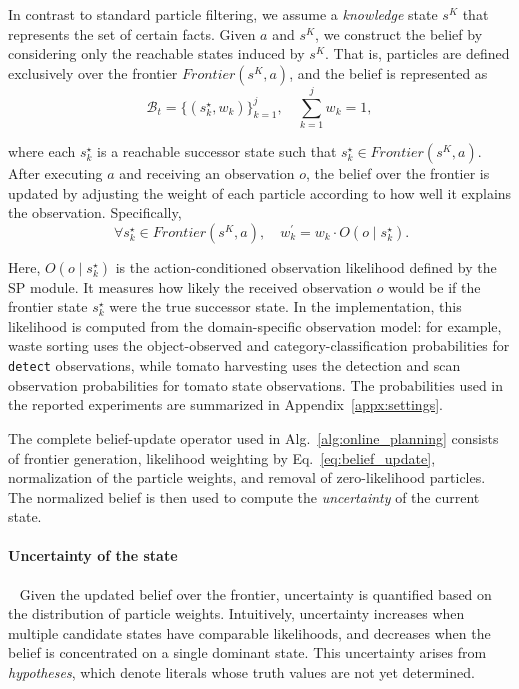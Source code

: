 In contrast to standard particle filtering, we assume a \textit{knowledge} state $s^{K}$ that represents the set of certain facts. Given $a$ and $s^{K}$, we construct the belief by considering only the reachable states induced by $s^{K}$. That is, particles are defined exclusively over the frontier $Frontier(s^{K}, a)$, and the belief is represented as
\[
\mathcal{B}_t = \{ (s_k^{\star}, w_k) \}_{k=1}^{j}, \quad \sum_{k=1}^{j} w_k = 1,
\]

where each $s_k^{\star}$ is a reachable successor state such that $s_k^{\star} \in Frontier(s^{K}, a)$.
After executing $a$ and receiving an observation $o$, the belief over the frontier is updated by adjusting the weight of each particle according to how well it explains the observation. Specifically, 
\begin{equation}~\label{eq:belief_update}
\forall s_k^{\star} \in Frontier(s^{K}, a), \quad
w_k^\prime = w_k \cdot O(o \mid s_k^{\star}).\end{equation}

Here, $O(o \mid s_k^{\star})$ is the action-conditioned observation likelihood defined by the SP module. It measures how likely the received observation $o$ would be if the frontier state $s_k^{\star}$ were the true successor state. In the implementation, this likelihood is computed from the domain-specific observation model: for example, waste sorting uses the object-observed and category-classification probabilities for \texttt{detect} observations, while tomato harvesting uses the detection and scan observation probabilities for tomato state observations. The probabilities used in the reported experiments are summarized in Appendix~\ref{appx:settings}.

The complete belief-update operator used in Alg.~\ref{alg:online_planning} consists of frontier generation, likelihood weighting by Eq.~\ref{eq:belief_update}, normalization of the particle weights, and removal of zero-likelihood particles. The normalized belief is then used to compute the \textit{uncertainty} of the current state.


\paragraph{Uncertainty of the state}~\label{method:uncertainty}
Given the updated belief over the frontier, uncertainty is quantified based on the distribution of particle weights. Intuitively, uncertainty increases when multiple candidate states have comparable likelihoods, and decreases when the belief is concentrated on a single dominant state. This uncertainty arises from \textit{hypotheses}, which denote literals whose truth values are not yet determined.

